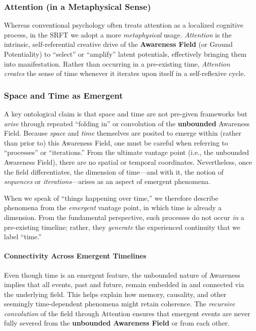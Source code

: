 \documentclass[12pt,a4paper]{article}
\begin{document}
\subsubsection{Attention (in a Metaphysical Sense)}
\label{subsubsec:attention}

Whereas conventional psychology often treats attention as a localized cognitive process, in the SRFT we adopt a more \emph{metaphysical} usage. \emph{Attention} is the intrinsic, self-referential creative drive of the \textbf{Awareness Field} (or Ground Potentiality) to ``select'' or ``amplify'' latent potentials, effectively bringing them into manifestation. Rather than occurring in a pre-existing time, \emph{Attention} \emph{creates} the sense of time whenever it iterates upon itself in a self-reflexive cycle.

\subsubsection{Space and Time as Emergent}
A key ontological claim is that space and time are not pre-given frameworks but \emph{arise} through repeated “folding in” or convolution of the \textbf{unbounded} Awareness Field. Because \emph{space} and \emph{time} themselves are posited to emerge 
within (rather than prior to) this Awareness Field, one must be careful when referring to “processes” or “iterations.” From the ultimate vantage point (i.e., the unbounded Awareness Field), there are no spatial or temporal coordinates. Nevertheless, once the 
field differentiates, the dimension of time—and with it, the notion of \emph{sequences} or \emph{iterations}—arises as an aspect of emergent phenomena.

When we speak of “things happening over time,” we therefore describe phenomena from the \emph{emergent} vantage point, in which time is already a dimension. From the fundamental perspective, such processes do not occur \emph{in} a pre-existing timeline; rather, they \emph{generate} the experienced continuity that we label “time.”


\paragraph{Connectivity Across Emergent Timelines}
Even though time is an emergent feature, the unbounded nature of Awareness implies that all events, past and future, remain embedded in and connected via the underlying field. This helps explain how memory, causality, and other seemingly time-dependent phenomena might retain coherence. The \emph{recursive convolution} of the field through Attention ensures that emergent events are never fully severed from the \textbf{unbounded Awareness Field} or from each other.
\end{document}
